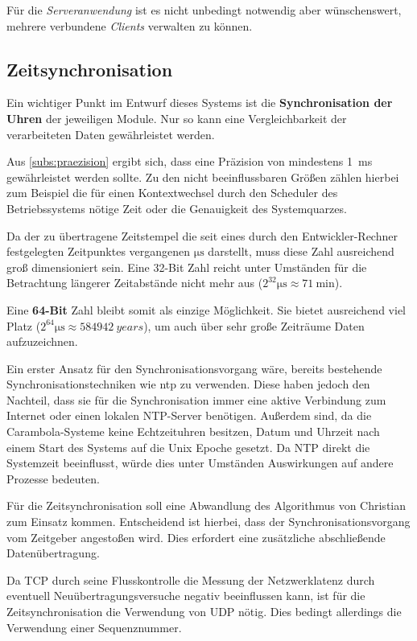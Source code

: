 Für die \emph{Serveranwendung} ist es nicht unbedingt notwendig aber
wünschenswert, mehrere verbundene \emph{Clients} verwalten zu können.
\subsection{Zeitsynchronisation}\label{subs:time}
Ein wichtiger Punkt im Entwurf dieses Systems ist die \textbf{Synchronisation
der Uhren} der jeweiligen Module. Nur so kann eine Vergleichbarkeit der
verarbeiteten Daten gewährleistet werden.

Aus \autoref{subs:praezision} ergibt sich, dass eine Präzision von mindestens
\SI{1}{\milli\second} gewährleistet werden sollte. Zu den nicht beeinflussbaren
Größen zählen hierbei zum Beispiel die für einen Kontextwechsel durch den
Scheduler des Betriebssystems nötige Zeit oder die Genauigkeit des
Systemquarzes.

Da der zu übertragene Zeitstempel die seit eines durch den Entwickler-Rechner
festgelegten Zeitpunktes vergangenen $\si{\micro\second}$ darstellt, muss diese
Zahl ausreichend groß dimensioniert sein. Eine 32-Bit Zahl reicht unter
Umständen für die Betrachtung längerer Zeitabstände nicht mehr aus
($2^{32}\si{\micro\second}\approx \SI{71}{\minute}$).

Eine \textbf{64-Bit} Zahl bleibt somit als einzige Möglichkeit. Sie bietet
ausreichend viel Platz ($2^{64}\si{\micro\second}\approx 584942~years$), um auch
über sehr große Zeiträume Daten aufzuzeichnen.

Ein erster Ansatz für den Synchronisationsvorgang wäre, bereits bestehende
Synchronisationstechniken wie \gls{ntp} zu verwenden. Diese haben jedoch den
Nachteil, dass sie für die Synchronisation immer eine aktive Verbindung zum
Internet oder einen lokalen NTP-Server  benötigen. Außerdem sind, da die
Carambola-Systeme keine Echtzeituhren besitzen, Datum und Uhrzeit nach einem
Start des Systems auf die Unix Epoche gesetzt. Da NTP direkt die Systemzeit
beeinflusst, würde dies unter Umständen Auswirkungen auf andere Prozesse
bedeuten.

Für die Zeitsynchronisation soll eine Abwandlung des Algorithmus von
Christian\cite{CHR} zum Einsatz kommen. Entscheidend ist hierbei, dass der
Synchronisationsvorgang vom Zeitgeber angestoßen wird. Dies erfordert eine
zusätzliche abschließende Datenübertragung.

Da TCP durch seine Flusskontrolle die Messung der Netzwerklatenz
durch eventuell Neuübertragungsversuche negativ beeinflussen kann, ist für die
Zeitsynchronisation die Verwendung von UDP nötig. Dies bedingt allerdings die
Verwendung einer Sequenznummer.

